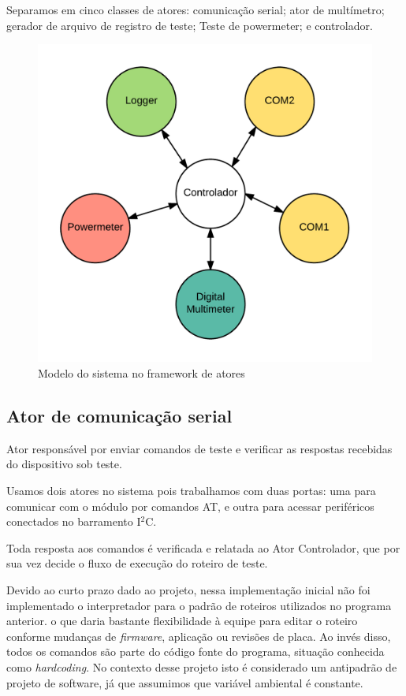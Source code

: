         Separamos em cinco classes de atores: comunicação serial; ator de multímetro; gerador de arquivo de registro de teste; Teste de powermeter; e controlador.
        \begin{figure}
            \centering
            \includegraphics[width=0.9\linewidth]{fig/sistemmodel}
            \caption{Modelo do sistema no framework de atores}
            \label{fig:modelo}
        \end{figure}
            
        \subsection{Ator de comunicação serial}
            Ator responsável por enviar comandos de teste e verificar as respostas recebidas do dispositivo sob teste.
            
            Usamos dois atores no sistema pois trabalhamos com duas portas: uma para comunicar com o módulo por comandos AT, e outra para acessar periféricos conectados no barramento  I$^{2}$C. 
            
            Toda resposta aos comandos é verificada e relatada ao Ator Controlador, que por sua vez decide o fluxo de execução do roteiro de teste. 
            
            Devido ao curto prazo dado ao projeto, nessa implementação inicial não foi implementado o interpretador para o padrão de roteiros utilizados no programa anterior. o que daria bastante flexibilidade à equipe para editar o roteiro conforme mudanças de \textit{firmware}, aplicação ou revisões de placa. Ao invés disso, todos os comandos são parte do código fonte do programa, situação conhecida como \textit{hardcoding}. No contexto desse projeto isto é considerado um antipadrão de projeto de software, já que assumimos que variável ambiental é constante. %
